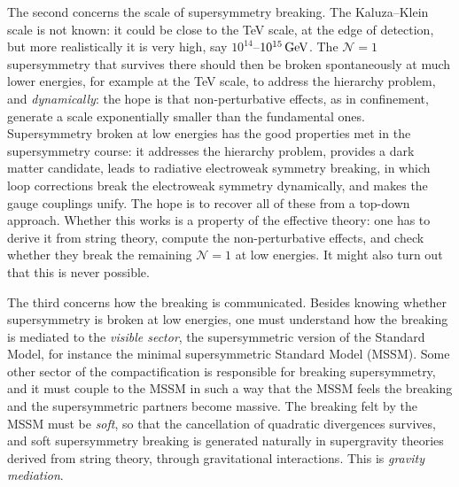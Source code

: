 The second concerns the scale of supersymmetry breaking. The Kaluza--Klein scale is not known: it could be close to the TeV scale, at the edge of detection, but more realistically it is very high, say $10^{14}$--$10^{15}\,\mathrm{GeV}$. The $\mathcal N=1$ supersymmetry that survives there should then be broken spontaneously at much lower energies, for example at the TeV scale, to address the hierarchy problem, and \emph{dynamically}: the hope is that non-perturbative effects, as in confinement, generate a scale exponentially smaller than the fundamental ones. Supersymmetry broken at low energies has the good properties met in the supersymmetry course: it addresses the hierarchy problem, provides a dark matter candidate, leads to radiative electroweak symmetry breaking, in which loop corrections break the electroweak symmetry dynamically, and makes the gauge couplings unify. The hope is to recover all of these from a top-down approach. Whether this works is a property of the effective theory: one has to derive it from string theory, compute the non-perturbative effects, and check whether they break the remaining $\mathcal N=1$ at low energies. It might also turn out that this is never possible.

The third concerns how the breaking is communicated. Besides knowing whether supersymmetry is broken at low energies, one must understand how the breaking is mediated to the \emph{visible sector}, the supersymmetric version of the Standard Model, for instance the minimal supersymmetric Standard Model (MSSM). Some other sector of the compactification is responsible for breaking supersymmetry, and it must couple to the MSSM in such a way that the MSSM feels the breaking and the supersymmetric partners become massive. The breaking felt by the MSSM must be \emph{soft}, so that the cancellation of quadratic divergences survives, and soft supersymmetry breaking is generated naturally in supergravity theories derived from string theory, through gravitational interactions. This is \emph{gravity mediation}.

